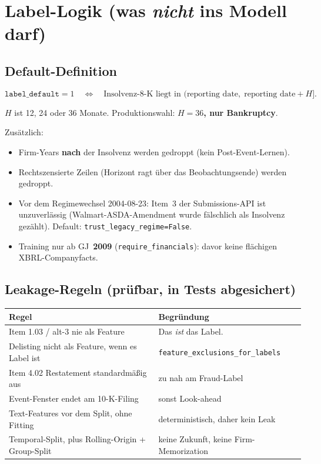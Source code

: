 \documentclass[11pt,a4paper]{article}
\begin{document}
\section{Label-Logik (was \emph{nicht} ins Modell darf)}

\subsection{Default-Definition}

\[
\texttt{label\_default}=1
\quad\Longleftrightarrow\quad
\text{Insolvenz-8-K liegt in }(\text{reporting date},\;\text{reporting date}+H].
\]

$H$ ist 12, 24 oder 36 Monate. Produktionswahl: \textbf{$H=36$, nur Bankruptcy}.

Zusätzlich:
\begin{itemize}[leftmargin=1.2em]
  \item Firm-Years \textbf{nach} der Insolvenz werden gedroppt (kein Post-Event-Lernen).
  \item Rechtszensierte Zeilen (Horizont ragt über das Beobachtungsende) werden gedroppt.
  \item Vor dem Regimewechsel 2004-08-23: Item~3 der Submissions-API ist unzuverlässig
        (Walmart-ASDA-Amendment wurde fälschlich als Insolvenz gezählt).
        Default: \texttt{trust\_legacy\_regime=False}.
  \item Training nur ab GJ~\textbf{2009} (\texttt{require\_financials}): davor keine
        flächigen XBRL-Companyfacts.
\end{itemize}

\subsection{Leakage-Regeln (prüfbar, in Tests abgesichert)}

\begin{tabularx}{\textwidth}{@{}l X@{}}
\toprule
Regel & Begründung \\
\midrule
Item 1.03 / alt-3 nie als Feature & Das \emph{ist} das Label. \\
Delisting nicht als Feature, wenn es Label ist & \texttt{feature\_exclusions\_for\_labels} \\
Item 4.02 Restatement standardmäßig aus & zu nah am Fraud-Label \\
Event-Fenster endet am 10-K-Filing & sonst Look-ahead \\
Text-Features vor dem Split, ohne Fitting & deterministisch, daher kein Leak \\
Temporal-Split, plus Rolling-Origin + Group-Split & keine Zukunft, keine Firm-Memorization \\
\bottomrule
\end{tabularx}
\end{document}
